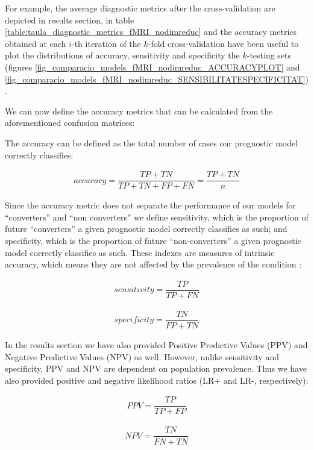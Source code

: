 \documentclass[a4paper,12pt]{elsarticle}  %
\begin{document}
For example, the average diagnostic metrics after the cross-validation are depicted in results section, in table \ref{table:taula_diagnostic_metrics_fMRI_nodimreduc} and the accuracy metrics obtained at each $i$-th iteration of the $k$-fold cross-validation have been useful to plot the distributions of accuracy, sensitivity and specificity the $k$-testing sets (figures \ref{fig_comparacio_models_fMRI_nodimreduc_ACCURACYPLOT} and \ref{fig_comparacio_models_fMRI_nodimreduc_SENSIBILITATESPECIFICITAT}).


We can now define the accuracy metrics that can be calculated from the aforementioned confusion matrices:

The accuracy can be defined as the total number of cases our prognostic model correctly classifies:

\begin{align}
accuracy = \dfrac{TP+TN}{TP+TN+FP+FN} = \dfrac{TP + TN}{n}
\end{align}

Since the accuracy metric does not separate the performance of our models for ``converters'' and ``non converters'' we define sensitivity, which is the proportion of future ``converters'' a given prognostic model correctly classifies as such; and specificity, which is the proportion of future ``non-converters'' a given prognostic model correctly classifies as such. These indexes are measures of intrinsic accuracy, which means they are not affected by the prevalence of the condition \cite{john2011}:

\begin{align}
sensitivity = \dfrac{TP}{TP+FN}
\end{align}

\begin{align}
specificity = \dfrac{TN}{FP+TN}
\end{align}


In the results section we have also provided Positive Predictive Values (PPV) and Negative Predictive Values (NPV) as well. However, unlike sensitivity and specificity, PPV and NPV are dependent on population prevalence. Thus we have also provided positive and negative likelihood ratios\cite{john2011} (LR+ and LR-, respectively):

\begin{align}
PPV = \dfrac{TP}{TP+FP}
\end{align}

\begin{align}
NPV = \dfrac{TN}{FN+TN}
\end{align}
\end{document}
